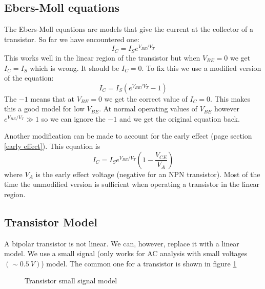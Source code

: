 \documentclass{article}
\begin{document}
    \subsection{Ebers-Moll equations}
    The Ebers-Moll equations are models that give the current at the collector of a transistor. So far we have encountered one:
    \[I_C=I_Se^{V_{BE}/V_T}\]
    This works well in the linear region of the transistor but when \(V_{BE} = 0\) we get \(I_C=I_S\) which is wrong. 
    It should be \(I_C=0\). To fix this we use a modified version of the equation:
    \[I_C=I_S\left(e^{V_{BE}/V_T}-1\right)\]
    The \(-1\) means that at \(V_{BE}=0\) we get the correct value of \(I_C=0\).
    This makes this a good model for low \(V_{BE}\).
    At normal operating values of \(V_{BE}\) however \(e^{V_{BE}/V_T} \gg 1\) so we can ignore the \(-1\) and we get the original equation back.
    
    Another modification can be made to account for the early effect (page \pageref{early effect} section \ref{early effect}). This equation is
    \[I_C = I_Se^{V_{BE}/V_T}\left(1 - \frac{V_{CE}}{V_A}\right)\]
    where \(V_A\) is the early effect voltage (negative for an NPN transistor).
    Most of the time the unmodified version is sufficient when operating a transistor in the linear region.
    
    \subsection{Transistor Model}
    A bipolar transistor is not linear. We can, however, replace it with a linear model. 
    We use a small signal (only works for AC analysis with small voltages \((\sim \SI{0.5}{V})\)) model. 
    The common one for a transistor is shown in figure \ref{fig:transistor model}
    
    \begin{figure}[ht]
        \centering
        \caption{Transistor small signal model}
        \label{fig:transistor model}
    \end{figure}
    
\end{document}
